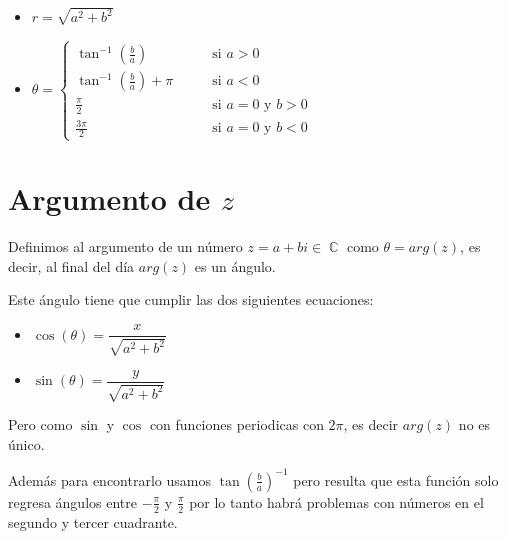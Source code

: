 \documentclass[12pt, fleqn]{report}                             %
\DeclareMathOperator \Space     {\quad}                         %
\theoremstyle{break}                                            %
\DeclareMathOperator \Complexs     {\mathbb{C}}                 %
\newcommand{\Wrap}[1]           {\left( #1 \right)}             %
\newcommand{\Cos}[1] {\cos\Wrap{#1}}                            %
\newcommand{\Sin}[1] {\sin\Wrap{#1}}                            %
\begin{document}
                \begin{itemize}
                    \item $r = \sqrt{a^2+b^2}$
                    \item $\theta = \begin{cases}
                                        \tan^{-1}(\frac{b}{a})          \Space &\text{ si } a > 0                  \\
                                        \tan^{-1}(\frac{b}{a})+\pi      \Space &\text{ si } a < 0                  \\
                                        \frac{\pi}{2}                   \Space &\text{ si } a = 0 \text{ y } b > 0 \\
                                        \frac{3\pi}{2}                  \Space &\text{ si } a = 0 \text{ y } b < 0 
                                    \end{cases}$
                \end{itemize}

        \clearpage
        \section{Argumento de $z$}
            
            Definimos al argumento de un número $z = a+bi \in \Complexs$ como $\theta = arg(z)$,
            es decir, al final del día $arg(z)$ es un ángulo.

            Este ángulo tiene que cumplir las dos siguientes ecuaciones:

            \begin{itemize}
                \item $\Cos{\theta} = \dfrac{x}{\sqrt{a^2+b^2}}$
                \item $\Sin{\theta}   = \dfrac{y}{\sqrt{a^2+b^2}}$
            \end{itemize}

            Pero como $\sin$ y $\cos$ con funciones periodicas con $2\pi$, es decir $arg(z)$ no es único.

            Además para encontrarlo usamos $\tan(\frac{b}{a})^{-1}$ pero resulta que esta función solo
            regresa ángulos entre $-\frac{\pi}{2}$ y $\frac{\pi}{2}$ por lo tanto habrá problemas con
            números en el segundo y tercer cuadrante.
\end{document}

